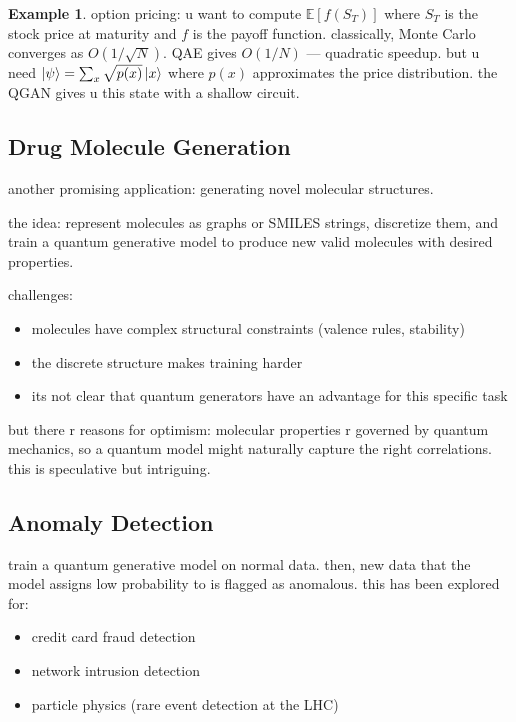 \documentclass[11pt,a4paper]{article}
\theoremstyle{definition}
\newtheorem{example}{Example}[section]
\theoremstyle{remark}
\begin{document}
\begin{example}
option pricing: u want to compute $\mathbb{E}[f(S_T)]$ where $S_T$ is the stock price at maturity and $f$ is the payoff function. classically, Monte Carlo converges as $O(1/\sqrt{N})$. QAE gives $O(1/N)$ --- quadratic speedup. but u need $\ket{\psi} = \sum_x \sqrt{p(x)} \ket{x}$ where $p(x)$ approximates the price distribution. the QGAN gives u this state with a shallow circuit.
\end{example}

\subsection{Drug Molecule Generation}

another promising application: generating novel molecular structures.

the idea: represent molecules as graphs or SMILES strings, discretize them, and train a quantum generative model to produce new valid molecules with desired properties.

challenges:
\begin{itemize}[nosep]
    \item molecules have complex structural constraints (valence rules, stability)
    \item the discrete structure makes training harder
    \item its not clear that quantum generators have an advantage for this specific task
\end{itemize}

but there r reasons for optimism: molecular properties r governed by quantum mechanics, so a quantum model might naturally capture the right correlations. this is speculative but intriguing.

\subsection{Anomaly Detection}

train a quantum generative model on normal data. then, new data that the model assigns low probability to is flagged as anomalous. this has been explored for:
\begin{itemize}[nosep]
    \item credit card fraud detection
    \item network intrusion detection
    \item particle physics (rare event detection at the LHC)
\end{itemize}
\end{document}
